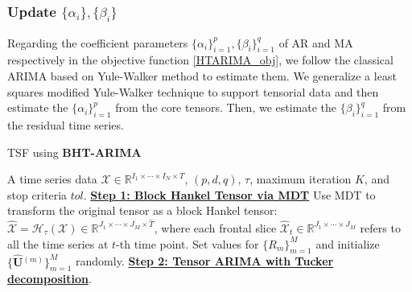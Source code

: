 \documentclass[letterpaper]{article} %
\numberwithin{theorem}{section}
\newcommand{\ten}[1]{ \boldsymbol{\mathcal #1}}
\newcommand{\bbR}[1]{\mathbb{R}^{#1}}
\begin{document}
\subsubsection{Update  $ \{\alpha_i \},  \{\beta_i \} $  }
Regarding the coefficient parameters $ \{\alpha_i \}_{i=1}^p,  \{\beta_i \}_{i=1}^q $ of AR and MA  respectively in the objective function \eqref{HTARIMA_obj}, we follow the classical ARIMA  based on  Yule-Walker method  to estimate them.  We generalize a least squares modified Yule-Walker technique to support tensorial data  and  then estimate  the  $ \{\alpha_i \}_{i=1}^p $  from the core tensors. Then, we estimate the $\{\beta_i \}_{i=1}^q $  from the residual time series.



\begin{algorithm}[ttt!]
	\small
	\caption{TSF using \textbf{BHT-ARIMA}} \label{BHTARIMAalg}
	\begin{algorithmic}[1]
		   A   time series data  $\ten{X}\in \bbR{I_1 \times \cdots \times I_N \times T}$,  $(p,d,q)$,   $\tau$,  maximum iteration $K$,   and  stop criteria  $\textit{tol}$.
		\STATE \textbf{\underline{Step 1: Block Hankel Tensor via MDT}}
		\STATE Use MDT to transform the original tensor as {a  block Hankel tensor}: ${\widehat{\ten{X}}} = \mathcal{H}_\tau (\ten{X}) \in \bbR{J_1 \times \cdots \times J_M \times \widehat{T}}$, where each frontal slice  ${\widehat{\ten{X}}_t}  \in \bbR{J_1 \times \cdots \times J_M}$ refers to all the time series at $t$-th time point.
		\STATE Set	values for  $
		\{R_m\}_{m=1}^{M}$ and initialize $\{\widehat{ \mathbf U}{^{(m)}}\}_{m=1}^{M}$ randomly.
		\STATE   \textbf{\underline{Step 2:   Tensor ARIMA with Tucker decomposition}}.


\end{algorithmic}
\end{algorithm}
\end{document}

